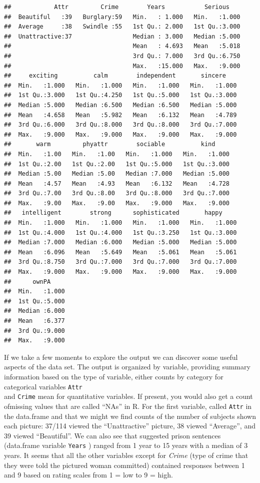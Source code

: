 \documentclass[]{book}
\begin{document}
\begin{verbatim}
##            Attr         Crime        Years           Serious     
##  Beautiful   :39   Burglary:59   Min.   : 1.000   Min.   :1.000  
##  Average     :38   Swindle :55   1st Qu.: 2.000   1st Qu.:3.000  
##  Unattractive:37                 Median : 3.000   Median :5.000  
##                                  Mean   : 4.693   Mean   :5.018  
##                                  3rd Qu.: 7.000   3rd Qu.:6.750  
##                                  Max.   :15.000   Max.   :9.000  
##     exciting          calm        independent       sincere     
##  Min.   :1.000   Min.   :1.000   Min.   :1.000   Min.   :1.000  
##  1st Qu.:3.000   1st Qu.:4.250   1st Qu.:5.000   1st Qu.:3.000  
##  Median :5.000   Median :6.500   Median :6.500   Median :5.000  
##  Mean   :4.658   Mean   :5.982   Mean   :6.132   Mean   :4.789  
##  3rd Qu.:6.000   3rd Qu.:8.000   3rd Qu.:8.000   3rd Qu.:7.000  
##  Max.   :9.000   Max.   :9.000   Max.   :9.000   Max.   :9.000  
##       warm         phyattr        sociable          kind      
##  Min.   :1.00   Min.   :1.00   Min.   :1.000   Min.   :1.000  
##  1st Qu.:2.00   1st Qu.:2.00   1st Qu.:5.000   1st Qu.:3.000  
##  Median :5.00   Median :5.00   Median :7.000   Median :5.000  
##  Mean   :4.57   Mean   :4.93   Mean   :6.132   Mean   :4.728  
##  3rd Qu.:7.00   3rd Qu.:8.00   3rd Qu.:8.000   3rd Qu.:7.000  
##  Max.   :9.00   Max.   :9.00   Max.   :9.000   Max.   :9.000  
##   intelligent        strong      sophisticated       happy      
##  Min.   :1.000   Min.   :1.000   Min.   :1.000   Min.   :1.000  
##  1st Qu.:4.000   1st Qu.:4.000   1st Qu.:3.250   1st Qu.:3.000  
##  Median :7.000   Median :6.000   Median :5.000   Median :5.000  
##  Mean   :6.096   Mean   :5.649   Mean   :5.061   Mean   :5.061  
##  3rd Qu.:8.750   3rd Qu.:7.000   3rd Qu.:7.000   3rd Qu.:7.000  
##  Max.   :9.000   Max.   :9.000   Max.   :9.000   Max.   :9.000  
##      ownPA      
##  Min.   :1.000  
##  1st Qu.:5.000  
##  Median :6.000  
##  Mean   :6.377  
##  3rd Qu.:9.000  
##  Max.   :9.000
\end{verbatim}

If we take a few moments to explore the output we can discover some
useful aspects of the data set. The output is organized by variable,
providing summary information based on the type of variable, either
counts by category for categorical variables \texttt{Attr}\\
and \texttt{Crime} mean for quantitative variables. If present, you
would also get a count ofmissing values that are called ``NAs'' in R.
For the first variable, called \texttt{Attr} in the data.frame and that
we might we find counts of the number of subjects shown each picture:
37/114 viewed the ``Unattractive'' picture, 38 viewed ``Average'', and
39 viewed ``Beautiful''. We can also see that suggested prison sentences
(data.frame variable \texttt{Years} ) ranged from 1 year to 15 years
with a median of 3 years. It seems that all the other variables except
for \emph{Crime} (type of crime that they were told the pictured woman
committed) contained responses between 1 and 9 based on rating scales
from 1 = low to 9 = high.
\end{document}
